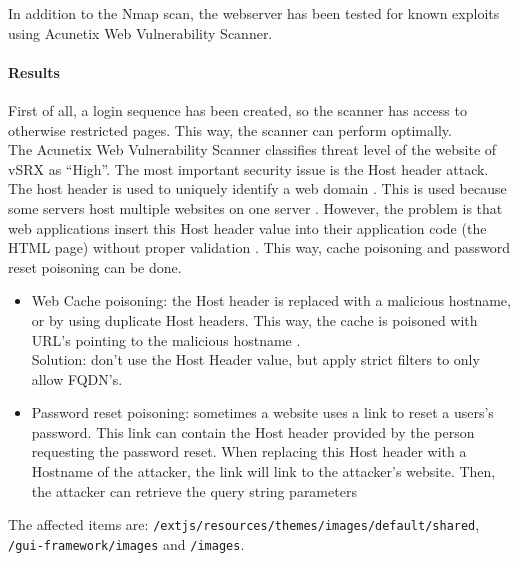 \documentclass[11pt, a4paper]{article}
\begin{document}
\clearpage

In addition to the Nmap scan, the webserver has been tested for known exploits using Acunetix Web Vulnerability Scanner.
\paragraph{Results} First of all, a login sequence has been created, so the scanner has access to otherwise restricted pages. This way, the scanner can perform optimally. \\
The Acunetix Web Vulnerability Scanner classifies threat level of the website of vSRX as ``High''. The most important security issue is the Host header attack. \\
The host header is used to uniquely identify a web domain \citep{hostheader}. This is used because some servers host multiple websites on one server \citep{hostheader2}. However, the problem is that web applications insert this Host header value into their application code (the HTML page) without proper validation \citep{hostheader3}. This way, cache poisoning and password reset poisoning can be done.
\begin{itemize}
\item  Web Cache poisoning:  the Host header is replaced with a malicious hostname, or by using duplicate Host headers. This way, the cache is poisoned with URL's pointing to the malicious hostname \citep{hostheader3}. \\
Solution: don't use the Host Header value, but apply strict filters to only allow FQDN's.
\item Password reset poisoning: sometimes a website uses a link to reset a users's password. This link can contain the Host header provided by the person requesting the password reset. When replacing this Host header with a Hostname of the attacker, the link will link to the attacker's website.  Then, the attacker can retrieve the query string parameters \citep{hostheader3}
\end{itemize}
The affected items are: \texttt{/extjs/resources/themes/images/default/shared}, \texttt{/gui-framework/images} and \texttt{/images}.
$\;$ \\ \\
\end{document}
